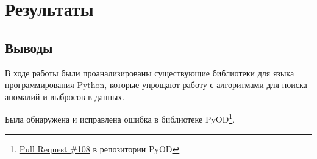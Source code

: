 \chapter{Результаты} \label{ch:ch5}

\section{Выводы} \label{ch:ch5/sect1}

В ходе работы были проанализированы существующие библиотеки для языка программирования Python, которые упрощают работу с алгоритмами для поиска аномалий и выбросов в данных.

Была обнаружена и исправлена ошибка в библиотеке PyOD\footnote{\href{https://github.com/yzhao062/pyod/pull/108}{Pull Request \#108} в репозитории PyOD}.

\clearpage